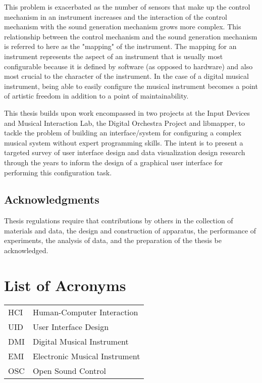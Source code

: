 \documentclass [12pt,letterpaper]{report}
\begin{document}
This problem is exacerbated as the number of sensors that make up the control mechanism in an instrument increases and the interaction of the control mechanism with the sound generation mechanism grows more complex. This relationship between the control mechanism and the sound generation mechanism is referred to here as the "mapping" of the instrument. The mapping for an instrument represents the aspect of an instrument that is usually most configurable because it is defined by software (as opposed to hardware) and also most crucial to the character of the instrument. In the case of a digital musical instrument, being able to easily configure the musical instrument becomes a point of artistic freedom in addition to a point of maintainability.

This thesis builds upon work encompassed in two projects at the Input Devices and Musical Interaction Lab, the Digital Orchestra Project and libmapper, to tackle the problem of building an interface/system for configuring a complex musical system without expert programming skills. The intent is to present a targeted survey of user interface design and data visualization design research through the years to inform the design of a graphical user interface for performing this configuration task.

\newpage

\section*{\centering Acknowledgments}

Thesis regulations require that contributions by others in the collection of
 materials and data, the design and construction of apparatus, the performance
 of experiments, the analysis of data, and the preparation of the thesis be
 acknowledged.

\tableofcontents
\listoffigures
\listoftables

\newpage
\chapter*{List of Acronyms}

\begin{longtable}{ll}
  HCI		&	Human-Computer Interaction\\
  UID		&	User Interface Design\\
  DMI		&	Digital Musical Instrument\\
  EMI		&	Electronic Musical Instrument\\
  OSC	&	Open Sound Control
\end{longtable}
\end{document}
